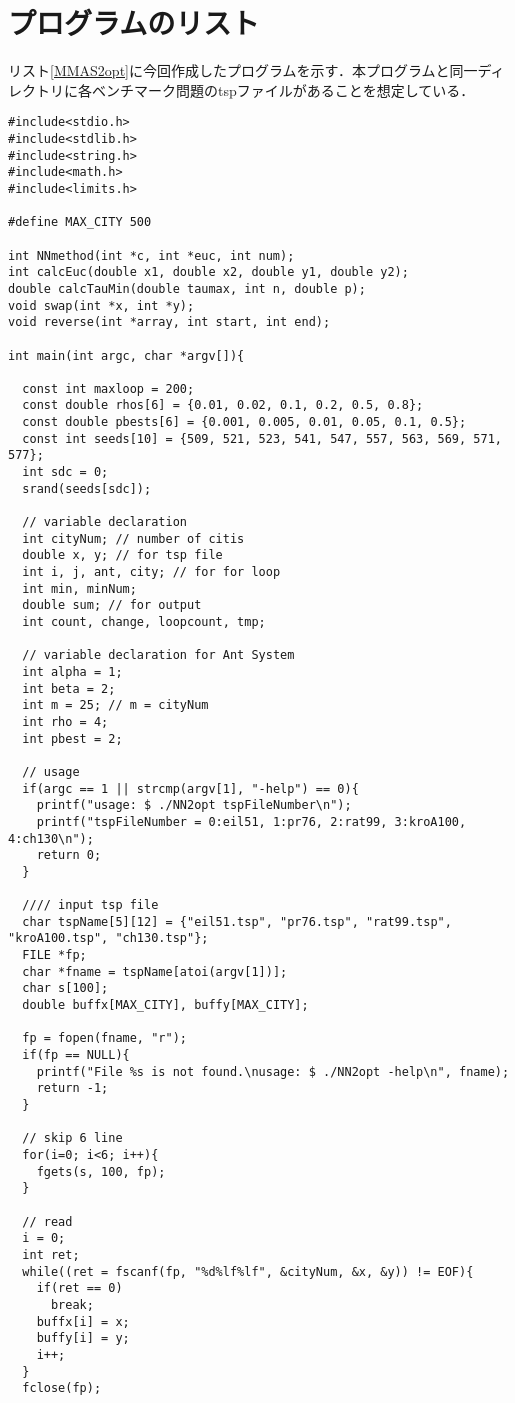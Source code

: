 \documentclass[a4j]{jsarticle}
\begin{document}
\newpage
\section{プログラムのリスト}
リスト\ref{MMAS2opt}に今回作成したプログラムを示す．本プログラムと同一ディレクトリに各ベンチマーク問題のtspファイルがあることを想定している．

\begin{lstlisting}[caption=MMAS2opt.c, label=MMAS2opt, xleftmargin=1cm]
#include<stdio.h>
#include<stdlib.h>
#include<string.h>
#include<math.h>
#include<limits.h>

#define MAX_CITY 500

int NNmethod(int *c, int *euc, int num);
int calcEuc(double x1, double x2, double y1, double y2);
double calcTauMin(double taumax, int n, double p);
void swap(int *x, int *y);
void reverse(int *array, int start, int end);

int main(int argc, char *argv[]){

  const int maxloop = 200;
  const double rhos[6] = {0.01, 0.02, 0.1, 0.2, 0.5, 0.8};
  const double pbests[6] = {0.001, 0.005, 0.01, 0.05, 0.1, 0.5};
  const int seeds[10] = {509, 521, 523, 541, 547, 557, 563, 569, 571, 577};
  int sdc = 0;
  srand(seeds[sdc]);
  
  // variable declaration
  int cityNum; // number of citis
  double x, y; // for tsp file
  int i, j, ant, city; // for for loop
  int min, minNum;
  double sum; // for output
  int count, change, loopcount, tmp;
  
  // variable declaration for Ant System
  int alpha = 1;
  int beta = 2;
  int m = 25; // m = cityNum
  int rho = 4;
  int pbest = 2;

  // usage
  if(argc == 1 || strcmp(argv[1], "-help") == 0){
    printf("usage: $ ./NN2opt tspFileNumber\n");
    printf("tspFileNumber = 0:eil51, 1:pr76, 2:rat99, 3:kroA100, 4:ch130\n");
    return 0;
  }

  //// input tsp file
  char tspName[5][12] = {"eil51.tsp", "pr76.tsp", "rat99.tsp", "kroA100.tsp", "ch130.tsp"};
  FILE *fp;
  char *fname = tspName[atoi(argv[1])];
  char s[100];
  double buffx[MAX_CITY], buffy[MAX_CITY];

  fp = fopen(fname, "r");
  if(fp == NULL){
    printf("File %s is not found.\nusage: $ ./NN2opt -help\n", fname);
    return -1;
  }

  // skip 6 line
  for(i=0; i<6; i++){
    fgets(s, 100, fp);
  }

  // read
  i = 0;
  int ret;
  while((ret = fscanf(fp, "%d%lf%lf", &cityNum, &x, &y)) != EOF){
    if(ret == 0)
      break;
    buffx[i] = x;
    buffy[i] = y;
    i++;
  }
  fclose(fp);  


\end{lstlisting}
\end{document}
